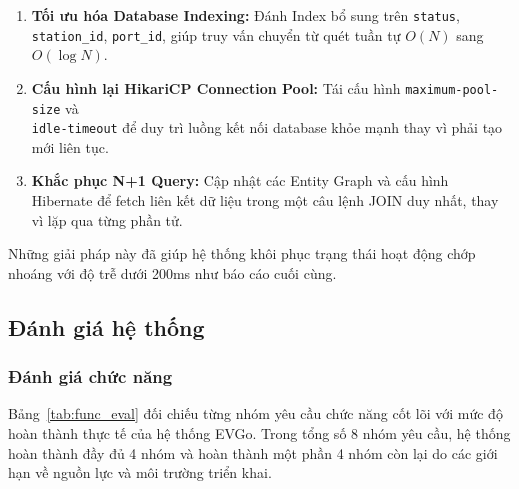 \begin{enumerate}
    \item \textbf{Tối ưu hóa Database Indexing:} Đánh Index bổ sung trên
          \texttt{status}, \texttt{station\_id}, \texttt{port\_id}, giúp truy vấn
          chuyển từ quét tuần tự $O(N)$ sang $O(\log N)$.
    \item \textbf{Cấu hình lại HikariCP Connection Pool:} Tái cấu hình
          \texttt{maximum-pool-size} và\\
          \texttt{idle-timeout} để duy trì luồng kết
          nối database khỏe mạnh thay vì phải tạo mới liên tục.
    \item \textbf{Khắc phục N+1 Query:} Cập nhật các Entity Graph và cấu hình
          Hibernate để fetch liên kết dữ liệu trong một câu lệnh JOIN duy nhất,
          thay vì lặp qua từng phần tử.
\end{enumerate}
Những giải pháp này đã giúp hệ thống khôi phục trạng thái hoạt động chớp nhoáng
với độ trễ dưới 200ms như báo cáo cuối cùng.

\subsection{Đánh giá hệ thống}

\subsubsection{Đánh giá chức năng}
\hspace*{\parindent}
Bảng~\ref{tab:func_eval} đối chiếu từng nhóm yêu cầu chức năng cốt lõi với mức độ
hoàn thành thực tế của hệ thống EVGo. Trong tổng số 8 nhóm yêu cầu, hệ thống
hoàn thành đầy đủ 4 nhóm và hoàn thành một phần 4 nhóm còn lại do các giới hạn
về nguồn lực và môi trường triển khai.

